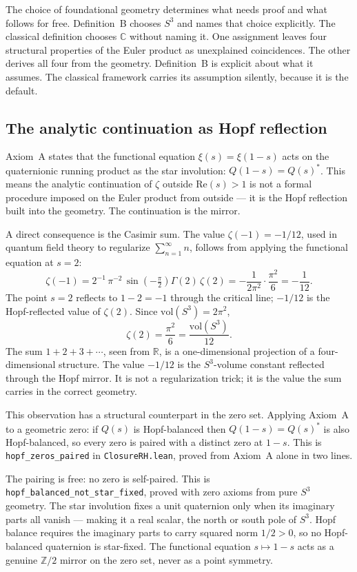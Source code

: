 \documentclass[12pt,a4paper]{article}
\theoremstyle{definition}
\theoremstyle{remark}
\begin{document}
The choice of foundational geometry determines what needs proof and what
follows for free. Definition~B chooses $S^3$ and names that choice
explicitly. The classical definition chooses $\mathbb{C}$ without naming it.
One assignment leaves four structural properties of the Euler product as
unexplained coincidences. The other derives all four from the geometry.
Definition~B is explicit about what it assumes. The classical framework
carries its assumption silently, because it is the default.

\subsection{The analytic continuation as Hopf reflection}

Axiom~A states that the functional equation $\xi(s) = \xi(1-s)$ acts on the
quaternionic running product as the star involution: $Q(1-s) = Q(s)^*$. This
means the analytic continuation of $\zeta$ outside $\mathrm{Re}(s) > 1$ is
not a formal procedure imposed on the Euler product from outside — it is the
Hopf reflection built into the geometry. The continuation is the mirror.

A direct consequence is the Casimir sum. The value $\zeta(-1) = -1/12$,
used in quantum field theory to regularize $\sum_{n=1}^\infty n$, follows
from applying the functional equation at $s = 2$:
\[
  \zeta(-1)
  = 2^{-1}\,\pi^{-2}\,\sin\!\left(-\tfrac{\pi}{2}\right)\Gamma(2)\,\zeta(2)
  = -\frac{1}{2\pi^2} \cdot \frac{\pi^2}{6}
  = -\frac{1}{12}.
\]
The point $s = 2$ reflects to $1-2 = -1$ through the critical line; $-1/12$
is the Hopf-reflected value of $\zeta(2)$. Since $\mathrm{vol}(S^3) = 2\pi^2$,
\[
  \zeta(2) = \frac{\pi^2}{6} = \frac{\mathrm{vol}(S^3)}{12}.
\]
The sum $1 + 2 + 3 + \cdots$, seen from $\mathbb{R}$, is a one-dimensional
projection of a four-dimensional structure. The value $-1/12$ is the
$S^3$-volume constant reflected through the Hopf mirror. It is not a
regularization trick; it is the value the sum carries in the correct geometry.

This observation has a structural counterpart in the zero set. Applying
Axiom~A to a geometric zero: if $Q(s)$ is Hopf-balanced then $Q(1-s) =
Q(s)^*$ is also Hopf-balanced, so every zero is paired with a distinct zero
at $1-s$. This is \texttt{hopf\_zeros\_paired} in \texttt{ClosureRH.lean},
proved from Axiom~A alone in two lines.

The pairing is free: no zero is self-paired. This is
\texttt{hopf\_balanced\_not\_star\_fixed}, proved with zero axioms from pure
$S^3$ geometry. The star involution fixes a unit quaternion only when its
imaginary parts all vanish — making it a real scalar, the north or south pole
of $S^3$. Hopf balance requires the imaginary parts to carry squared norm
$1/2 > 0$, so no Hopf-balanced quaternion is star-fixed. The functional
equation $s \mapsto 1-s$ acts as a genuine $\mathbb{Z}/2$ mirror on the zero
set, never as a point symmetry.
\end{document}
